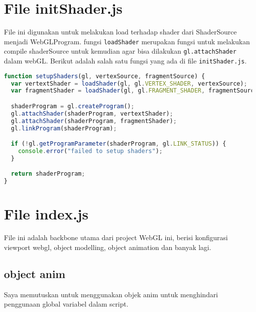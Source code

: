 \section{File initShader.js}

File ini digunakan untuk melakukan load terhadap shader dari ShaderSource menjadi WebGLProgram. fungsi \texttt{loadShader} merupakan fungsi untuk melakukan compile shaderSource untuk kemudian agar bisa dilakukan \texttt{gl.attachShader} dalam webGL. Berikut adalah salah satu fungsi yang ada di file \texttt{initShader.js}.


\begin{lstlisting}[language=javascript, label={lst: setupShader}, caption={fungsi setupShader}]
function setupShaders(gl, vertexSource, fragmentSource) {
  var vertextShader = loadShader(gl, gl.VERTEX_SHADER, vertexSource);
  var fragmentShader = loadShader(gl, gl.FRAGMENT_SHADER, fragmentSource);

  shaderProgram = gl.createProgram();
  gl.attachShader(shaderProgram, vertextShader);
  gl.attachShader(shaderProgram, fragmentShader);
  gl.linkProgram(shaderProgram);

  if (!gl.getProgramParameter(shaderProgram, gl.LINK_STATUS)) {
    console.error("failed to setup shaders");
  }

  return shaderProgram;
}

\end{lstlisting}

\section{File index.js}

File ini adalah backbone utama dari project WebGL ini, berisi konfigurasi viewport webgl, object modelling, object animation dan banyak lagi.

\subsection*{object anim}

Saya memutuskan untuk menggunakan objek anim untuk menghindari penggunaan global variabel dalam script.

